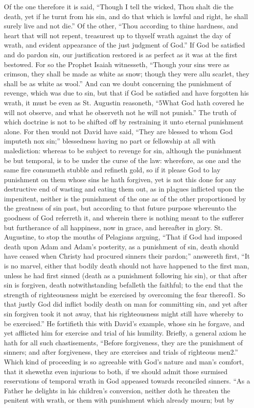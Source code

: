 Of the one therefore it is said, “Though I tell the wicked, Thou shalt die the death, yet if he turnt from his sin, and do that which is lawful and right, he shall surely live and not die.” Of the other, “Thou according to thine hardness, and heart that will not repent, treasurest up to thyself wrath against the day of wrath, and evident appearance of the just judgment of God.” If God be satisfied and do pardon sin, our justification restored is as perfect as it was at the first bestowed. For so the Prophet Isaiah witnesseth, “Though your sins were as crimson, they shall be made as white as snow; though they were allu scarlet, they shall be as white as wool.” And can we doubt concerning the punishment of revenge, which was due to sin, but that if God be satisfied and have forgotten his wrath, it must be even as St. Augustin reasoneth, “5What God hath covered he will not observe, and what he observeth not he will not punish.” The truth of which doctrine is not to be shifted off by restraining it unto eternal punishment alone. For then would not David have said, “They are blessed to whom God imputeth nox sin;” blessedness having no part or fellowship at all with malediction: whereas to be subject to revenge for sin, although the punishment be but temporal, is to be under the curse of the law: wherefore, as one and the same fire consumeth  stubble and refineth gold, so if it please God to lay punishment on them whose sins he hath forgiven, yet is not this done for any destructive end of wasting and eating them out, as in plagues inflicted upon the impenitent, neither is the punishment of the one as of the other proportioned by the greatness of sin past, but according to that future purpose whereunto the goodness of God referreth it, and wherein there is nothing meant to the sufferer but furtherance of all happiness, now in grace, and hereafter in glory. St. Augustine, to stop the mouths of Pelagians arguing, “That if God had imposed death upon Adam and Adam’s posterity, as a punishment of sin, death should have ceased when Christy had procured sinners their pardon;” answereth first, “It is no marvel, either that bodily death should not have happened to the first man, unless he had first sinned (death as a punishment following his sin), or that after sin is forgiven, death notwithstanding befalleth the faithful; to the end that the strength of righteousness might be exercised by overcoming the fear thereof1. So that justly God did inflict bodily death on man for committing sin, and yet after sin forgiven took it not away, that his righteousness might still have whereby to be exercised.” He fortifieth this with David’s example, whose sin he forgave, and yet afflicted him for exercise and trial of his humility. Briefly, a general axiom he hath for all such chastisements, “Before forgiveness, they are the punishment of sinners; and after forgiveness, they are exercises and trials of righteous men2.” Which kind of proceeding is so agreeable with God’s nature and man’s comfort, that it shewethz even injurious to both, if we should admit those surmised reservations of temporal wrath in God appeased towards  reconciled sinners. “As a Father he delights in his children’s conversion, neither doth he threaten the penitent with wrath, or them with punishment which already mourn; but by 